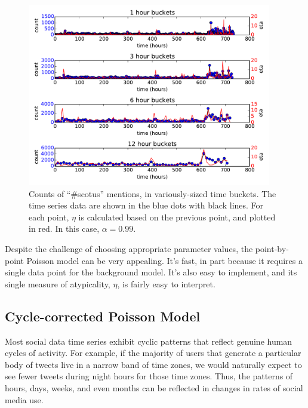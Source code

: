\documentclass{article}
\begin{document}
\begin{figure}
\begin{center}
\includegraphics[width=0.95\textwidth]{fig/scotus_bucket_size.pdf}
\caption{Counts of ``\#scotus'' mentions, in variously-sized time buckets. The time
series data are shown in the blue dots with black lines. For each point, $\eta$ is
calculated based on the previous point, and plotted in red. In this case,
$\alpha = 0.99$.}
\label{fig:scotus2}
\end{center}
\end{figure}

Despite the challenge of choosing appropriate parameter values, the
point-by-point Poisson model can be very appealing. It's fast, in part
because it requires a single data point for the background model. It's also
easy to implement, and its single measure of atypicality, $\eta$, is fairly easy
to interpret. 

\subsection{Cycle-corrected Poisson Model}
\label{ccpm}

Most social data time series exhibit cyclic patterns that reflect genuine human
cycles of activity. For example, if the majority of users that generate a
particular body of tweets live in a narrow band of time zones, we would
naturally expect to see fewer tweets during night hours for those time zones.
Thus, the patterns of hours, days, weeks, and even months can be reflected in
changes in rates of social media use. 
\end{document}
